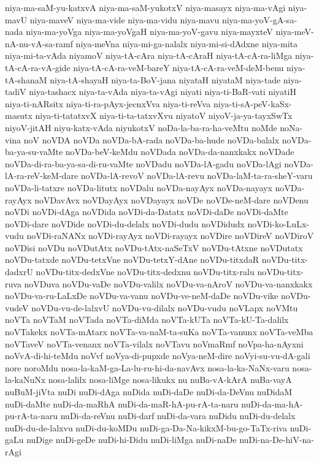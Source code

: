 {niya-ma-saM-yu-katxvA
niya-ma-saM-yukotxV
niya-masayx
niya-ma-vAgi
niya-mavU
niya-maveV
niya-ma-vide
niya-ma-vidu
niya-mavu
niya-ma-yoV-gA-sa-nada
niya-ma-yoVga
niya-ma-yoVgaH
niya-ma-yoV-gavu
niya-mayxteV
niya-meV-nA-nu-vA-sa-ramf
niya-meVna
niya-mi-ga-nalalx
niya-mi-si-dAdxne
niya-mita
niya-mi-ta-vAda
niyamoV
niya-tA-cAra
niya-tA-cAraH
niya-tA-cA-ra-liMga
niya-tA-cA-ra-vA-gide
niya-tA-cA-ra-veM-bareY
niya-tA-cA-ra-veM-deM-benu
niya-tA-shanaM
niya-tA-shayaH
niya-ta-BoV-jana
niyataH
niyataM
niya-tade
niya-tadiV
niya-tashacx
niya-ta-vAda
niya-ta-vAgi
niyati
niya-ti-BaR-vati
niyatiH
niya-ti-nARsitx
niya-ti-ra-pAyx-jecnxVva
niya-ti-reVva
niya-ti-sA-peV-kaSx-masutx
niya-ti-tatatxvX
niya-ti-ta-tatxvXvu
niyatoV
niyoV-ja-ya-tayxSwTx
niyoV-jitAH
niyu-katx-vAda
niyukotxV
noDa-la-ba-ra-ha-veMtu
noMde
noNa-vina
noV
noVDA
noVDa
noVDa-bA-rada
noVDa-ba-hude
noVDa-balalx
noVDa-ba-ya-su-vaMte
noVDa-beV-keMdu
noVDada
noVDa-da-nanxkakx
noVDade
noVDa-di-ra-ba-ya-sa-di-ru-vaMte
noVDadu
noVDa-lA-gadu
noVDa-lAgi
noVDa-lA-ra-reV-keM-dare
noVDa-lA-revoV
noVDa-lA-revu
noVDa-laM-ta-ra-sheY-varu
noVDa-li-tatxre
noVDa-litutx
noVDalu
noVDa-nayAyx
noVDa-nayayx
noVDa-rayAyx
noVDavAvx
noVDayAyx
noVDayayx
noVDe
noVDe-neM-dare
noVDenu
noVDi
noVDi-dAga
noVDida
noVDi-da-Datatx
noVDi-daDe
noVDi-daMte
noVDi-dare
noVDide
noVDi-du-delalx
noVDi-dudu
noVDidudx
noVDi-ko-LuLx-vudu
noVDi-raNANx
noVDi-rayAyx
noVDi-rayayx
noVDire
noVDireV
noVDiroV
noVDisi
noVDu
noVDutAtx
noVDu-tAtx-naSeTxV
noVDu-tAtxne
noVDutatx
noVDu-tatxde
noVDu-tetxVne
noVDu-tetxY-dAne
noVDu-titxdaR
noVDu-titx-dadxrU
noVDu-titx-dedxVne
noVDu-titx-dedxnu
noVDu-titx-ralu
noVDu-titx-ruva
noVDuva
noVDu-vaDe
noVDu-valilx
noVDu-va-nAroV
noVDu-va-nanxkakx
noVDu-va-ru-LaLxDe
noVDu-va-vanu
noVDu-ve-neM-daDe
noVDu-vike
noVDu-vudeV
noVDu-vu-de-lalxvU
noVDu-vu-dilalx
noVDu-vudu
noVLapx
noVMtu
noVTa
noVTaM
noVTada
noVTa-diMda
noVTa-kUTa
noVTa-kU-Ta-dalilx
noVTakekx
noVTa-mAtarx
noVTa-va-naM-ta-suKa
noVTa-vanunx
noVTa-veMba
noVTaveV
noVTa-venanx
noVTa-vilalx
noVTavu
noVmaRmf
noVpa-ha-nAyxni
noVvA-di-hi-teMdu
noVvf
noVya-di-pupxde
noVya-neM-dire
noVyi-su-vu-dA-gali
nore
noroMdu
nosa-la-kaM-ga-La-lu-ru-hi-da-navAvx
nosa-la-ka-NaNx-varu
nosa-la-kaNuNx
nosa-lalilx
nosa-liMge
nosa-likukx
nu
nuBa-vA-kArA
nuBa-vayA
nuBuM-jiVta
nuDi
nuDi-dAga
nuDida
nuDi-daDe
nuDi-da-DeVnu
nuDidaM
nuDi-daMte
nuDi-da-maRhA
nuDi-da-maR-hA-pu-rA-ta-naru
nuDi-da-ma-hA-pu-rA-ta-naru
nuDi-da-reVnu
nuDi-darf
nuDi-da-vara
nuDidu
nuDi-du-delalx
nuDi-du-de-lalxvu
nuDi-du-koMDu
nuDi-ga-Da-Na-kikxM-bu-go-TaTx-riva
nuDi-gaLu
nuDige
nuDi-geDe
nuDi-hi-Didu
nuDi-liMga
nuDi-naDe
nuDi-na-De-hiV-na-rAgi
}
